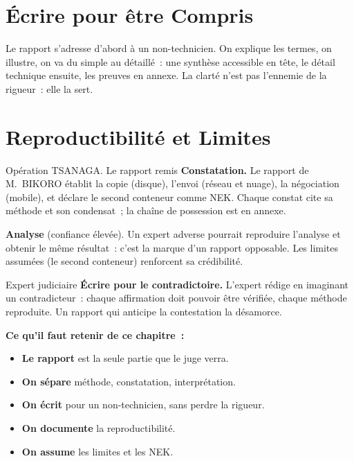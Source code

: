 \section{Écrire pour être Compris}
\label{sec:c18-ecrire}

Le rapport s'adresse d'abord à un non-technicien. On explique les termes, on
illustre, on va du simple au détaillé~: une synthèse accessible en tête, le
détail technique ensuite, les preuves en annexe. La clarté n'est pas l'ennemie
de la rigueur~: elle la sert.

\section{Reproductibilité et Limites}
\label{sec:c18-limites}

\begin{boxscenario}{Opération TSANAGA. Le rapport remis}
\textbf{Constatation.} Le rapport de M.~BIKORO établit la copie (disque),
l'envoi (réseau et nuage), la négociation (mobile), et déclare le second
conteneur comme NEK. Chaque constat cite sa méthode et son condensat~; la
chaîne de possession est en annexe.

\medskip
\textbf{Analyse} (confiance élevée). Un expert adverse pourrait reproduire
l'analyse et obtenir le même résultat~: c'est la marque d'un rapport
opposable. Les limites assumées (le second conteneur) renforcent sa
crédibilité.
\end{boxscenario}

\begin{boxmetier}{Expert judiciaire}
\textbf{Écrire pour le contradictoire.} L'expert rédige en imaginant un
contradicteur~: chaque affirmation doit pouvoir être vérifiée, chaque méthode
reproduite. Un rapport qui anticipe la contestation la désamorce.
\end{boxmetier}

\separateur

\begin{boxresume}
\textbf{Ce qu'il faut retenir de ce chapitre~:}
\begin{itemize}
    \item \textbf{Le rapport} est la seule partie que le juge verra.
    \item \textbf{On sépare} méthode, constatation, interprétation.
    \item \textbf{On écrit} pour un non-technicien, sans perdre la rigueur.
    \item \textbf{On documente} la reproductibilité.
    \item \textbf{On assume} les limites et les NEK.
\end{itemize}
\end{boxresume}


